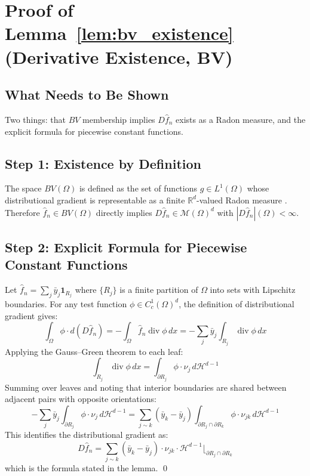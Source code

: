 \documentclass[12pt]{article}
\newcommand{\R}{\mathbb{R}}
\newcommand{\Lone}{L^1(\Omega)}
\newcommand{\BV}{BV(\Omega)}
\newcommand{\cM}{\mathcal{M}(\Omega)^d}
\newcommand{\fn}{\hat{f}_n}
\begin{document}
	\section{Proof of Lemma~\ref{lem:bv_existence}
		(Derivative Existence, BV)}
	\label{app:lem_bv_existence}
	
	\subsection{What Needs to Be Shown}
	
	Two things: that $BV$ membership implies $D\fn$ exists as a Radon measure,
	and the explicit formula for piecewise constant functions.
	
	\subsection{Step 1: Existence by Definition}
	
	The space $\BV$ is defined as the set of functions $g \in \Lone$ whose
	distributional gradient is representable as a finite $\R^d$-valued Radon
	measure \citep[Chapter~3]{ambrosio2000bv}. Therefore $\fn \in \BV$ directly
	implies $D\fn \in \cM$ with $|D\fn|(\Omega) < \infty$.
	
	\subsection{Step 2: Explicit Formula for Piecewise Constant Functions}
	
	Let $\fn = \sum_j \bar{y}_j \mathbf{1}_{R_j}$ where $\{R_j\}$ is a finite
	partition of $\Omega$ into sets with Lipschitz boundaries. For any test
	function $\phi \in C_c^1(\Omega)^d$, the definition of distributional gradient
	gives:
	\begin{equation}
		\int_\Omega \phi \cdot d(D\fn)
		= -\int_\Omega \fn \operatorname{div} \phi \, dx
		= -\sum_j \bar{y}_j \int_{R_j} \operatorname{div} \phi \, dx
	\end{equation}
	Applying the Gauss--Green theorem to each leaf:
	\begin{equation}
		\int_{R_j} \operatorname{div} \phi \, dx
		= \int_{\partial R_j} \phi \cdot \nu_j \, d\mathcal{H}^{d-1}
	\end{equation}
	Summing over leaves and noting that interior boundaries are shared between
	adjacent pairs with opposite orientations:
	\begin{equation}
		-\sum_j \bar{y}_j \int_{\partial R_j} \phi \cdot \nu_j \, d\mathcal{H}^{d-1}
		= \sum_{j \sim k} (\bar{y}_k - \bar{y}_j)
		\int_{\partial R_j \cap \partial R_k} \phi \cdot \nu_{jk}
		\, d\mathcal{H}^{d-1}
	\end{equation}
	This identifies the distributional gradient as:
	\begin{equation}
		D\fn = \sum_{j \sim k} (\bar{y}_k - \bar{y}_j) \cdot \nu_{jk} \cdot
		\mathcal{H}^{d-1}\lfloor_{\partial R_j \cap \partial R_k}
	\end{equation}
	which is the formula stated in the lemma.
	\qed
	
\end{document}
